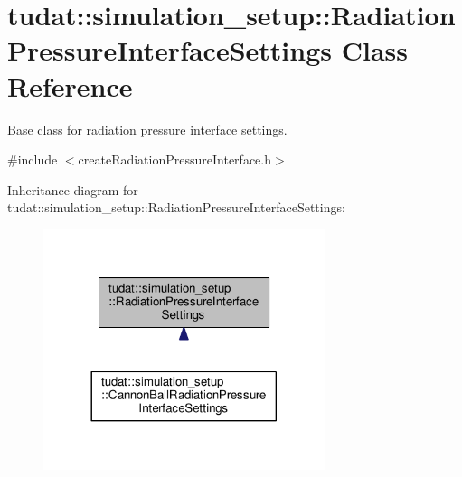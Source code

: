 \hypertarget{classtudat_1_1simulation__setup_1_1RadiationPressureInterfaceSettings}{}\section{tudat\+:\+:simulation\+\_\+setup\+:\+:Radiation\+Pressure\+Interface\+Settings Class Reference}
\label{classtudat_1_1simulation__setup_1_1RadiationPressureInterfaceSettings}


Base class for radiation pressure interface settings.  




{\ttfamily \#include $<$create\+Radiation\+Pressure\+Interface.\+h$>$}



Inheritance diagram for tudat\+:\+:simulation\+\_\+setup\+:\+:Radiation\+Pressure\+Interface\+Settings\+:
\nopagebreak
\begin{figure}[H]
\begin{center}
\leavevmode
\includegraphics[width=233pt]{classtudat_1_1simulation__setup_1_1RadiationPressureInterfaceSettings__inherit__graph}
\end{center}
\end{figure}
